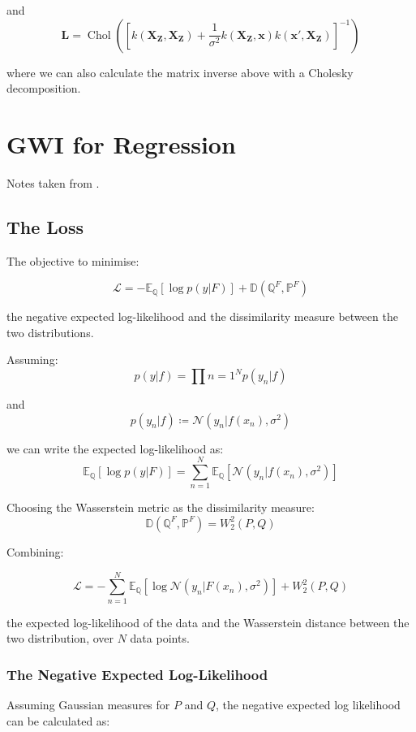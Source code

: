 \documentclass[twoside,11pt]{article}
\newcommand{\Chol}{\operatorname{Chol}}
\begin{document}
and
\[\mathbf{L} = \Chol\left( \left[k(\mathbf{X}_{\mathbf{Z}}, \mathbf{X}_{\mathbf{Z}}) + \frac{1}{\sigma^2} k(\mathbf{X}_{\mathbf{Z}}, \mathbf{x})k(\mathbf{x}', \mathbf{X}_{\mathbf{Z}})\right]^{-1}\right)\]

where we can also calculate the matrix inverse above with a Cholesky decomposition.

\section{GWI for Regression}\label{sec:gwi-for-regression}

Notes taken from \cite{wild2022generalized}.

\subsection{The Loss}\label{subsec:gwi-for-regression-the-liss}


The objective to minimise:

\[\mathcal{L} = - \mathbb{E}_{\mathbb{Q}}\left[ \log p(y |F)\right] + \mathbb{D}(\mathbb{Q}^F, \mathbb{P}^F)\]

the negative expected log-likelihood and the dissimilarity measure between the two distributions.

Assuming:
\[p(y|f) = \prod{n=1}^N p(y_n | f)\]

and
\[p(y_n | f) \coloneqq \mathcal{N}(y_n| f(x_n), \sigma^2)\]

we can write the expected log-likelihood as:
\[\mathbb{E}_{\mathbb{Q}}\left[ \log p(y |F)\right] =\sum_{n=1}^N \mathbb{E}_{\mathbb{Q}}\left[\mathcal{N}(y_n| f(x_n), \sigma^2)\right]\]

Choosing the Wasserstein metric as the dissimilarity measure:
\[\mathbb{D}(\mathbb{Q}^F, \mathbb{P}^F) = W_2^2(P, Q)\]

Combining:

\[\mathcal{L} = - \sum_{n=1}^N \mathbb{E}_{\mathbb{Q}}\left[ \log \mathcal{N}(y_n |F(x_n), \sigma^2)\right] + W_2^2(P, Q)\]

the expected log-likelihood of the data and the Wasserstein distance between the two distribution, over $N$ data points.

\subsubsection{The Negative Expected Log-Likelihood}

Assuming Gaussian measures for $P$ and $Q$, the negative expected log likelihood can be calculated as:
\end{document}
